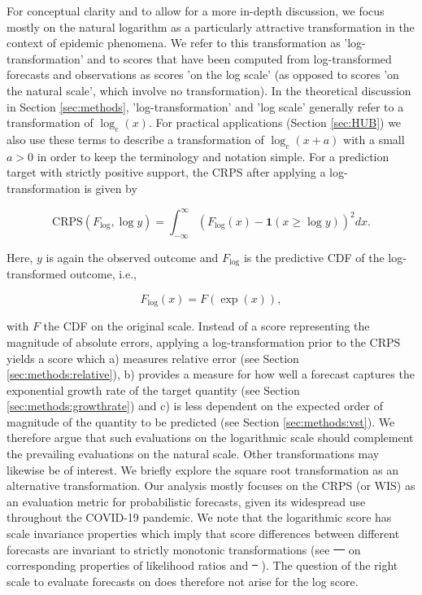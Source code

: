 \documentclass[10pt,letterpaper]{article} %
\providecommand{\DIFaddtex}[1]{{\protect\color{blue}\uwave{#1}}} %
\providecommand{\DIFdeltex}[1]{{\protect\color{red}\sout{#1}}}                      %
\providecommand{\DIFaddbegin}{} %
\providecommand{\DIFaddend}{} %
\providecommand{\DIFdelbegin}{} %
\providecommand{\DIFdelend}{} %
\providecommand{\DIFadd}[1]{\texorpdfstring{\DIFaddtex{#1}}{#1}} %
\providecommand{\DIFdel}[1]{\texorpdfstring{\DIFdeltex{#1}}{}} %
\newcommand{\DIFscaledelfig}{0.5}
\newlength{\DIFdelgraphicswidth} %
\newlength{\DIFdelgraphicsheight} %
\newcommand{\DIFaddincludegraphics}[2][]{{\color{blue}\fbox{\DIFOincludegraphics[#1]{#2}}}} %
\newcommand{\DIFdelincludegraphics}[2][]{%
\sbox{\DIFdelgraphicsbox}{\DIFOincludegraphics[#1]{#2}}%
\settoboxwidth{\DIFdelgraphicswidth}{\DIFdelgraphicsbox} %
\settoboxtotalheight{\DIFdelgraphicsheight}{\DIFdelgraphicsbox} %
\scalebox{\DIFscaledelfig}{%
\parbox[b]{\DIFdelgraphicswidth}{\usebox{\DIFdelgraphicsbox}\\[-\baselineskip] \rule{\DIFdelgraphicswidth}{0em}}\llap{\resizebox{\DIFdelgraphicswidth}{\DIFdelgraphicsheight}{%
\setlength{\unitlength}{\DIFdelgraphicswidth}%
\begin{picture}(1,1)%
\thicklines\linethickness{2pt} %
{\color[rgb]{1,0,0}\put(0,0){\framebox(1,1){}}}%
{\color[rgb]{1,0,0}\put(0,0){\line( 1,1){1}}}%
{\color[rgb]{1,0,0}\put(0,1){\line(1,-1){1}}}%
\end{picture}%
}\hspace*{3pt}}} %
} %
\DeclareRobustCommand{\DIFaddbegin}{\DIFOaddbegin \let\includegraphics\DIFaddincludegraphics} %
\DeclareRobustCommand{\DIFaddend}{\DIFOaddend \let\includegraphics\DIFOincludegraphics} %
\DeclareRobustCommand{\DIFdelbegin}{\DIFOdelbegin \let\includegraphics\DIFdelincludegraphics} %
\DeclareRobustCommand{\DIFdelend}{\DIFOaddend \let\includegraphics\DIFOincludegraphics} %
\begin{document}
For conceptual clarity and to allow for a more in-depth discussion, we focus mostly on the natural logarithm as a particularly attractive transformation in the context of epidemic phenomena. We refer to this transformation as 'log-transformation' and to scores that have been computed from log-transformed forecasts and observations as scores 'on the log scale' (as opposed to scores 'on the natural scale', which involve no transformation). In the theoretical discussion in Section \ref{sec:methods}, 'log-transformation' and 'log scale' generally refer to a transformation of $\log_{e}(x)$. For practical applications (Section \ref{sec:HUB}) we also use these terms to describe a transformation of $\log_{e}(x + a)$ with a small $a > 0$ in order to keep the terminology and notation simple. For a prediction target with strictly positive support, the CRPS after applying a log-transformation is given by
%
\begin{linenomath*}
\begin{equation}
    \text{CRPS}(F_{\log}, \log y) = \int_{-\infty}^\infty \left( F_{\log}(x) - \boldsymbol{1}(x \geq \log y) \right)^2 dx.
\end{equation}    
\end{linenomath*}
%
Here, $y$ is again the observed outcome and $F_{\log}$ is the predictive CDF of the log-transformed outcome, i.e.,
\begin{linenomath*}
\begin{equation}
F_{\log}(x) = F(\exp(x)),
\end{equation}    
\end{linenomath*}
with $F$ the CDF on the original scale. Instead of a score representing the magnitude of absolute errors, applying a log-transformation prior to the CRPS yields a score which a) measures relative error (see Section \ref{sec:methods:relative}), b) provides a measure for how well a forecast captures the exponential growth rate of the target quantity (see Section \ref{sec:methods:growthrate}) and c) is less dependent on the expected order of magnitude of the quantity to be predicted (see Section \ref{sec:methods:vst}). 
We therefore argue that such evaluations on the logarithmic scale should complement the prevailing evaluations on the natural scale. 
Other transformations may likewise be of interest. We briefly explore the square root transformation as an alternative transformation. 
Our analysis mostly focuses on the CRPS (or WIS) as an evaluation metric for probabilistic forecasts, given its widespread use throughout the COVID-19 pandemic. We note that the logarithmic score has scale invariance properties which imply that score differences between different forecasts are invariant to strictly monotonic transformations (see \DIFdelbegin \DIFdel{\mbox{%
\citealt{Lehmann1950} }\hskip0pt%
}\DIFdelend \DIFaddbegin \DIFadd{\mbox{%
\cite{Lehmann1950} }\hskip0pt%
}\DIFaddend on corresponding properties of likelihood ratios and \DIFdelbegin \DIFdel{\mbox{%
\citealt{diksLikelihoodbasedScoringRules2011}}\hskip0pt%
}\DIFdelend \DIFaddbegin \DIFadd{\mbox{%
\cite{diksLikelihoodbasedScoringRules2011}}\hskip0pt%
}\DIFaddend ). The question of the right scale to evaluate forecasts on does therefore not arise for the log score. 
\end{document}
